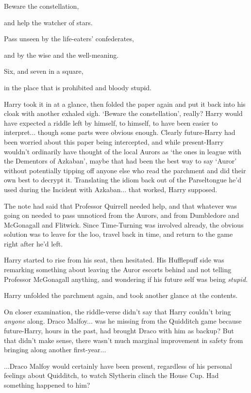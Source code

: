 Beware the constellation,

and help the watcher of stars.

Pass unseen by the life-eaters' confederates,

and by the wise and the well-meaning.

Six, and seven in a square,

in the place that is prohibited and bloody stupid.

Harry took it in at a glance, then folded the paper again and put it back into his cloak with another exhaled sigh. `Beware the constellation', really? Harry would have expected a riddle left by himself, to himself, to have been easier to interpret... though some parts were obvious enough. Clearly future-Harry had been worried about this paper being intercepted, and while present-Harry wouldn't ordinarily have thought of the local Aurors as `the ones in league with the Dementors of Azkaban', maybe that had been the best way to say `Auror' without potentially tipping off anyone else who read the parchment and did their own best to decrypt it. Translating the idiom back out of the Parseltongue he'd used during the Incident with Azkaban... that worked, Harry supposed.

The note had said that Professor Quirrell needed help, and that whatever was going on needed to pass unnoticed from the Aurors, and from Dumbledore and McGonagall and Flitwick. Since Time-Turning was involved already, the obvious solution was to leave for the loo, travel back in time, and return to the game right after he'd left.

Harry started to rise from his seat, then hesitated. His Hufflepuff side was remarking something about leaving the Auror escorts behind and not telling Professor McGonagall anything, and wondering if his future self was being \emph{stupid.}

Harry unfolded the parchment again, and took another glance at the contents.

On closer examination, the riddle-verse didn't say that Harry couldn't bring \emph{anyone} along. Draco Malfoy... was he missing from the Quidditch game because future-Harry, hours in the past, had brought Draco with him as backup? But that didn't make sense, there wasn't much marginal improvement in safety from bringing along another first-year...

...Draco Malfoy would certainly have been present, regardless of his personal feelings about Quidditch, to watch Slytherin clinch the House Cup. Had something happened to him?

